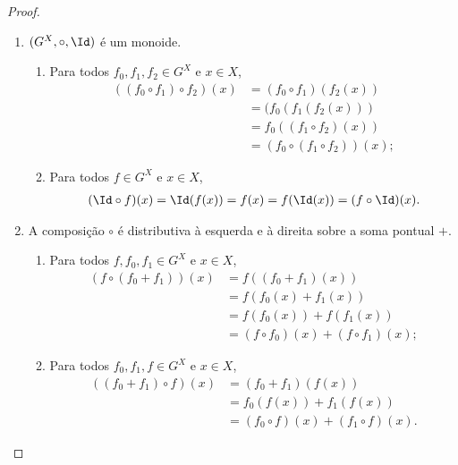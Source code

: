 \begin{proof}
\begin{enumerate}
	\item $(G^X,\circ,\Id)$ é um monoide.
		\begin{enumerate}
		\item Para todos $f_0,f_1,f_2 \in G^X$ e $x \in X$,
			\begin{align*}
			((f_0 \circ f_1) \circ f_2)(x) &= (f_0 \circ f_1)(f_2(x)) \\
				&= (f_0(f_1(f_2(x))) \\
				&= f_0((f_1 \circ f_2)(x)) \\
				&= (f_0 \circ (f_1 \circ f_2))(x);
			\end{align*}
		\item Para todos $f \in G^X$ e $x \in X$,
			\begin{align*}
			(\Id \circ f)(x) = \Id(f(x)) = f(x) = f(\Id(x)) = (f \circ \Id)(x).
			\end{align*}
		\end{enumerate}
	\item A composição $\circ$ é distributiva à esquerda e à direita sobre a soma pontual $+$.
		\begin{enumerate}
		\item Para todos $f,f_0,f_1 \in G^X$ e $x \in X$,
			\begin{align*}
			(f \circ (f_0+f_1))(x) &= f((f_0+f_1)(x)) \\
				&= f(f_0(x)+f_1(x)) \\
				&= f(f_0(x))+f(f_1(x)) \\
				&= (f \circ f_0)(x) + (f \circ f_1)(x);
			\end{align*}
		\item Para todos $f_0,f_1,f \in G^X$ e $x \in X$,
			\begin{align*}
			((f_0+f_1) \circ f)(x) &= (f_0+f_1)(f(x)) \\
				&= f_0(f(x)) + f_1(f(x)) \\
				&= (f_0 \circ f)(x) + (f_1 \circ f)(x).
			\end{align*}
		\end{enumerate}
	\end{enumerate}
\end{proof}

